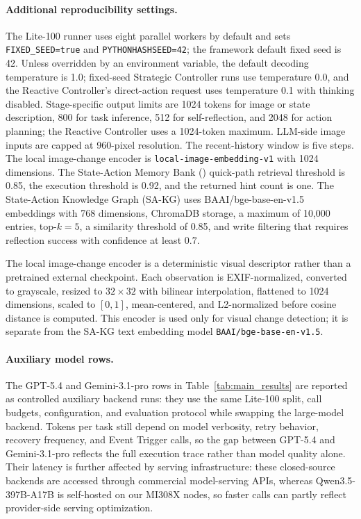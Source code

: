\paragraph{Additional reproducibility settings.}
\label{sec:appendix_additional_reproducibility_settings}
The Lite-100 runner uses eight parallel
workers by default and sets \texttt{FIXED\_SEED=true} and
\texttt{PYTHONHASHSEED=42}; the framework default fixed seed is 42. Unless
overridden by an environment variable, the default decoding temperature is 1.0;
fixed-seed Strategic Controller runs use temperature 0.0, and the Reactive
Controller's direct-action request uses temperature 0.1 with thinking disabled.
Stage-specific output limits are 1024 tokens for image or state description,
800 for task inference, 512 for self-reflection, and 2048 for action planning;
the Reactive Controller uses a 1024-token maximum. LLM-side image inputs are
capped at 960-pixel resolution.
The recent-history window is five steps. The local image-change encoder is
\texttt{local-image-embedding-v1} with 1024 dimensions. The State-Action Memory
Bank (\samb{}) quick-path retrieval threshold is 0.85, the execution threshold
is 0.92, and the returned \samb{} hint count is one. The State-Action Knowledge
Graph (SA-KG) uses BAAI/bge-base-en-v1.5 embeddings with 768
dimensions, ChromaDB storage, a maximum of 10,000 entries, top-$k=5$, a
similarity threshold of 0.85, and write filtering that requires reflection
success with confidence at least 0.7.

The local image-change encoder is a deterministic visual descriptor rather than
a pretrained external checkpoint. Each observation is EXIF-normalized, converted
to grayscale, resized to $32 \times 32$ with bilinear interpolation, flattened
to 1024 dimensions, scaled to $[0,1]$, mean-centered, and L2-normalized before
cosine distance is computed. This encoder is used only for visual change
detection; it is separate from the SA-KG text embedding model
\texttt{BAAI/bge-base-en-v1.5}.

\paragraph{Auxiliary model rows.}
\label{sec:appendix_model_token_note}
The GPT-5.4 and Gemini-3.1-pro rows in Table~\mbox{\ref{tab:main_results}} are
reported as controlled auxiliary backend runs: they use the same Lite-100 split,
call budgets, \method{} configuration, and evaluation protocol while swapping
the large-model backend. Tokens per task still depend on model verbosity, retry
behavior, recovery frequency, and Event Trigger calls, so the gap between
GPT-5.4 and Gemini-3.1-pro reflects the full execution trace rather than model
quality alone. Their latency is further affected by serving
infrastructure: these closed-source backends are accessed through commercial
model-serving APIs, whereas Qwen3.5-397B-A17B is self-hosted on our MI308X
nodes, so faster calls can partly reflect provider-side serving optimization.


